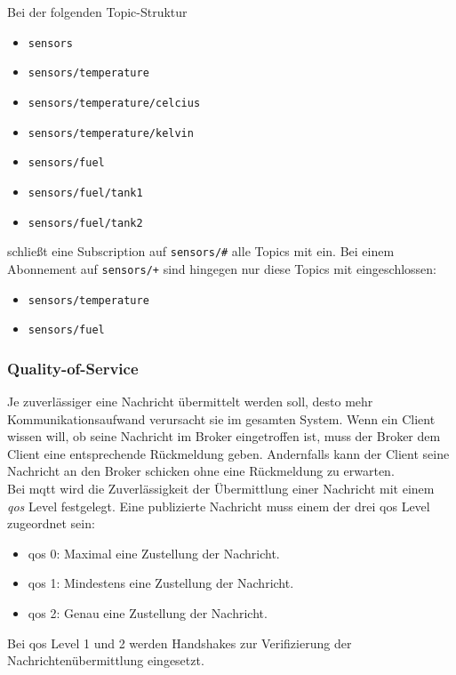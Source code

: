 Bei der folgenden Topic-Struktur
\begin{itemize}
    \item \verb|sensors|
    \item \verb|sensors/temperature|
    \item \verb|sensors/temperature/celcius|
    \item \verb|sensors/temperature/kelvin|
    \item \verb|sensors/fuel|
    \item \verb|sensors/fuel/tank1|
    \item \verb|sensors/fuel/tank2|
\end{itemize}
schlie{\ss}t eine Subscription auf \verb|sensors/#| alle Topics mit ein. Bei einem Abonnement auf \verb|sensors/+| sind hingegen nur diese Topics mit eingeschlossen:
\begin{itemize}
    \item \verb|sensors/temperature|
    \item \verb|sensors/fuel|
\end{itemize}

\subsubsection{Quality-of-Service} \label{s:qos}
Je zuverlässiger eine Nachricht übermittelt werden soll, desto mehr Kommunikationsaufwand verursacht sie im gesamten System.
Wenn ein Client wissen will, ob seine Nachricht im Broker eingetroffen ist, muss der Broker dem Client eine entsprechende Rückmeldung geben. Andernfalls kann der Client seine Nachricht an den Broker schicken ohne eine Rückmeldung zu erwarten.
\\
Bei \ac{mqtt} wird die Zuverlässigkeit der Übermittlung einer Nachricht mit einem \textit{\acf{qos}} Level festgelegt. Eine publizierte Nachricht muss einem der drei \ac{qos} Level zugeordnet sein:
\begin{itemize}
    \item \ac{qos} 0: Maximal eine Zustellung der Nachricht.
    \item \ac{qos} 1: Mindestens eine Zustellung der Nachricht.
    \item \ac{qos} 2: Genau eine Zustellung der Nachricht.
\end{itemize}
Bei \ac{qos} Level 1 und 2 werden Handshakes zur Verifizierung der Nachrichtenübermittlung eingesetzt.\cite{mqtt5Specification}


